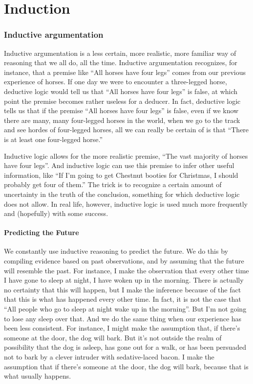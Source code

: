 \chapter{Induction}

\subsection{Inductive argumentation}
Inductive argumentation is a less certain, more realistic, more familiar way of
reasoning that we all do, all the time. Inductive argumentation recognizes, for instance, that a premise like
``All horses have four legs'' comes from our previous
experience of horses. If one day we were to encounter
a three-legged horse, deductive logic would tell us that
``All horses have four legs'' is false, at which point the
premise becomes rather useless for a deducer. In fact,
deductive logic tells us that if the premise ``All horses
have four legs'' is false, even if we know there are many,
many four-legged horses in the world, when we go
to the track and see hordes of four-legged horses, all
we can really be certain of is that ``There is at least one
four-legged horse.''

     Inductive logic allows for the more realistic
premise, ``The vast majority of horses have four legs''.
And inductive logic can use this premise to infer other
useful information, like ``If I'm going to get Chestnut
booties for Christmas, I should probably get four of
them.'' The trick is to recognize a certain amount of
uncertainty in the truth of the conclusion, something
for which deductive logic does not allow. In real life,
however, inductive logic is used much more frequently
and (hopefully) with some success. 

\subsubsection{Predicting the Future}

We constantly use inductive reasoning to predict the
future. We do this by compiling evidence based on
past observations, and by assuming that the future will
resemble the past. For instance, I make the observation
that every other time I have gone to sleep at night,
I have woken up in the morning. There is actually
no certainty that this will happen, but I make the
inference because of the fact that this is what has happened every other time. In fact, it is not the case that
``All people who go to sleep at night wake up in the
morning''. But I'm not going to lose any sleep over that.
And we do the same thing when our experience has
been less consistent. For instance, I might make the assumption that, if there's someone at the door, the dog
will bark. But it's not outside the realm of possibility
that the dog is asleep, has gone out for a walk, or has
been persuaded not to bark by a clever intruder with
sedative-laced bacon. I make the assumption that if
there's someone at the door, the dog will bark, because
that is what usually happens.

